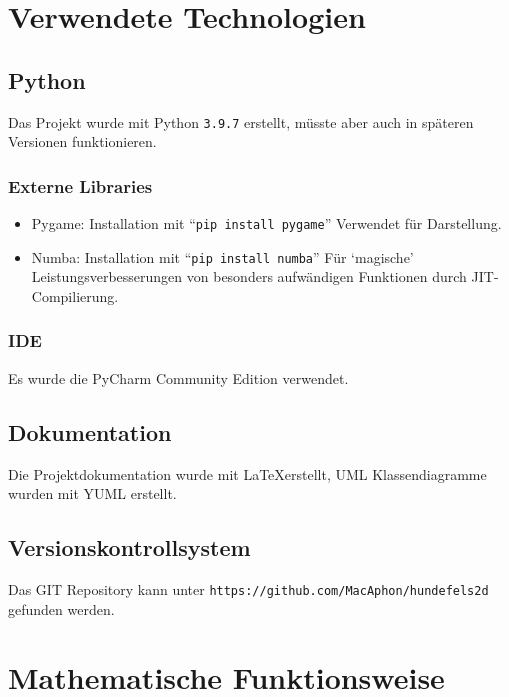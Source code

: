 \documentclass[a4paper,titlepage]{article}
\begin{document}
\newpage

\section{Verwendete Technologien}

\subsection{Python}

Das Projekt wurde mit Python \verb|3.9.7| erstellt, müsste aber auch in späteren Versionen funktionieren.

\subsubsection*{Externe Libraries}

\begin{itemize}
	\item Pygame: Installation mit ``\verb|pip install pygame|''
	Verwendet für Darstellung.
	\item Numba: Installation mit ``\verb|pip install numba|''
	Für `magische' Leistungsverbesserungen von besonders aufwändigen Funktionen durch JIT-Compilierung.
\end{itemize}

\subsubsection*{IDE}

Es wurde die PyCharm Community Edition verwendet.

\subsection{Dokumentation}

Die Projektdokumentation wurde mit \LaTeX erstellt,
UML Klassendiagramme wurden mit YUML erstellt.

\subsection{Versionskontrollsystem}

Das GIT Repository kann unter \verb|https://github.com/MacAphon/hundefels2d| gefunden werden.

\newpage
\section{Mathematische Funktionsweise}
\end{document}
